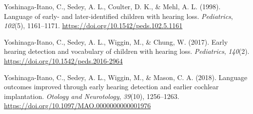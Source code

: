 \documentclass[english,man]{apa6}
\begin{document}
\leavevmode\hypertarget{ref-yoshinaga-itano1998}{}%
Yoshinaga-Itano, C., Sedey, A. L., Coulter, D. K., \& Mehl, A. L. (1998). Language of early- and later-identified children with hearing loss. \emph{Pediatrics}, \emph{102}(5), 1161--1171. \url{https://doi.org/10.1542/peds.102.5.1161}

\leavevmode\hypertarget{ref-yoshinaga-itano2017}{}%
Yoshinaga-Itano, C., Sedey, A. L., Wiggin, M., \& Chung, W. (2017). Early hearing detection and vocabulary of children with hearing loss. \emph{Pediatrics}, \emph{140}(2). \url{https://doi.org/10.1542/peds.2016-2964}

\leavevmode\hypertarget{ref-yoshinaga-itano2018}{}%
Yoshinaga-Itano, C., Sedey, A. L., Wiggin, M., \& Mason, C. A. (2018). Language outcomes improved through early hearing detection and earlier cochlear implantation. \emph{Otology and Neurotology}, \emph{39}(10), 1256--1263. \url{https://doi.org/10.1097/MAO.0000000000001976}
\end{document}

